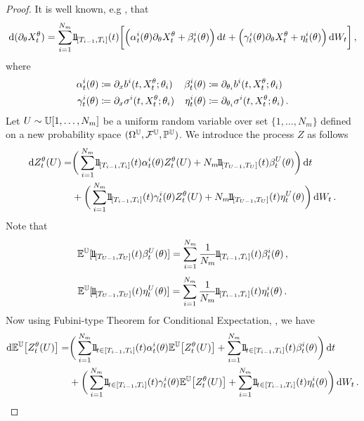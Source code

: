 \begin{proof}
It is well known, e.g \cite{Krylov1999OnDiffusions, Kunita1997StochasticEquations}, that
\[
\begin{split}
\D (\partial_\theta X_t^{\theta}) = \sum_{i=1}^{N_{m}} \ind_{[T_{i-1},T_i]}(t)   \bigg[  \Big( \alpha^i_t(\theta)\partial_{\theta} X_t^{\theta}   +   \beta^i_t(\theta)\Big)\, \D t  
 + \Big( \gamma^i_t(\theta) \partial_{\theta} X_t^{\theta}   +   \eta^i_t(\theta) \Big)\,\D W_t \bigg] \,,	
\end{split}
\]
where 
\begin{align*}
\alpha^i_t(\theta) &\coloneqq  \partial_x b^i(t,X_t^\theta; \theta_i) & \beta^i_t(\theta) &\coloneqq  \partial_{\theta_i} b^i(t,X_t^\theta;\theta_i) \\
\gamma^i_t(\theta) &\coloneqq  \partial_x \sigma^i(t,X_t^\theta; \theta_i) & \eta^i_t(\theta) &\coloneqq  \partial_{\theta_i} \sigma^i(t,X_t^\theta; \theta_i)\,.
\end{align*}
Let $U\sim \mathbb{U}[1,\ldots,N_{m}]$ be a uniform random variable over set $\{1,\dots, N_{m}\}$ defined on a new probability space $( \Omega^{\mathbb{U}}, \mathcal{F}^{\mathbb{U}}, \mathbb{P}^{\mathbb{U}})$. 
We introduce the process $Z$ as follows
\[
\begin{split}
\D Z_t^{\theta}(U) = & \bigg(\sum_{i=1}^{N_{m}} \ind_{[T_{i-1},T_i]}(t) \alpha^i_t(\theta) Z_t^{\theta}(U)   +  N_m \ind_{[T_{U-1},T_U]}(t) \beta^U_t(\theta) \bigg)\, \D t \\  
& + \bigg(\sum_{i=1}^{N_{m}} \ind_{[T_{i-1},T_i]}(t)\gamma^i_t(\theta)  Z_t^{\theta}(U)   +  N_m \ind_{[T_{U-1},T_U]}(t) \eta^U_t(\theta) \bigg)\, \D W_t \,. 
\end{split}
\]
Note that
\[
\EE^{\UU}[ \ind_{[T_{U-1},T_U]}(t)\beta^U_t(\theta) ] = \sum_{i=1}^{N_{m}} \frac1{N_m}\ind_{[T_{i-1},T_i]}(t) \beta^i_t(\theta)\,,
\]
\[
\EE^{\UU}[\ind_{[T_{U-1},T_U]}(t) \eta^U_t(\theta) ] = \sum_{i=1}^{N_{m}} \frac1{N_m}\ind_{[T_{i-1},T_i]}(t) \eta^i_t(\theta) \,.
\]
Now using Fubini-type Theorem for Conditional Expectation, \cite[Lemma A5]{Hammersley2019WeakNoise}, we have
\[
\begin{split}
\D\EE^{\UU} \big[Z_t^{\theta}(U)\big] =  & \bigg(\sum_{i=1}^{N_{m}} \ind_{t\in[T_{i-1},T_i]}(t) \alpha^i_t(\theta)  \EE^{\UU} \big[Z_t^{\theta}(U)\big]   +  \sum_{i=1}^{N_{m}} \ind_{t\in[T_{i-1},T_i]}(t) \beta^i_t(\theta)  \bigg)\,\D t \\  
& + \bigg(\sum_{i=1}^{N_{m}} \ind_{t\in[T_{i-1},T_i]}(t) \gamma^i_t(\theta)  \EE^{\UU} \big[Z_t^{\theta}(U)\big]  +  \sum_{i=1}^{N_{m}} \ind_{t\in[T_{i-1},T_i]}(t) \eta^i_t(\theta)  \bigg)\, \D W_t \,. 

\end{split}\]
\end{proof}
